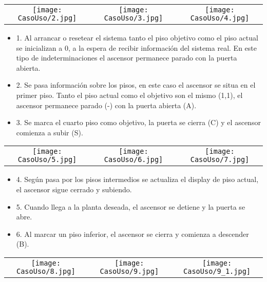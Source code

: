     
	\begin{table}[H]
	\centering
	\begin{tabular}{ccc}
		 \texttt{[image: CasoUso/2.jpg]}  & 
		 \texttt{[image: CasoUso/3.jpg]} & 
		 \texttt{[image: CasoUso/4.jpg]}   \\
	\end{tabular}
	\end{table}
	
	\begin{itemize}
	    \item 1. Al arrancar o resetear el sistema tanto el piso objetivo como el piso actual se inicializan a 0, a la espera de recibir información del sistema real. En este tipo de indeterminaciones el ascensor permanece parado con la puerta abierta.	
	    \item 2. Se pasa información sobre los pisos, en este caso el ascensor se situa en el primer piso. Tanto el piso actual como el objetivo son el mismo (1,1), el ascensor permanece parado (-) con la puerta abierta (A).	
	    \item 3. Se marca el cuarto piso como objetivo, la puerta se cierra (C) y el ascensor comienza a subir (S).
	\end{itemize}
	
	\begin{table}[H]
	\centering
	\begin{tabular}{ccc}
		  \texttt{[image: CasoUso/5.jpg]} &
		 \texttt{[image: CasoUso/6.jpg]}  &
		  \texttt{[image: CasoUso/7.jpg]}   \\
	\end{tabular}
	\end{table}
	
	\begin{itemize}
	    \item 4. Según pasa por los pisos intermedios se actualiza el display de piso actual, el ascensor sigue cerrado y subiendo.	
	    \item 5.  Cuando llega a la planta deseada, el ascensor se detiene y la puerta se abre.	
	    \item 6.  Al marcar un piso inferior, el ascensor se cierra y comienza a descender (B).	
	\end{itemize}
	
	\begin{table}[H]
	\centering
	\begin{tabular}{ccc}
		 \texttt{[image: CasoUso/8.jpg]}   &
		 \texttt{[image: CasoUso/9.jpg]} &
		 \texttt{[image: CasoUso/9\_1.jpg]}  \\
	\end{tabular}
	\end{table}
	
